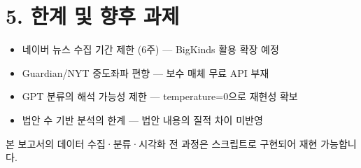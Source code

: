 \documentclass[11pt, a4paper]{article}
\begin{document}
\section*{\color{headerblue}5. 한계 및 향후 과제}
\begin{itemize}[noitemsep]
    \item 네이버 뉴스 수집 기간 제한 (6주) — BigKinds 활용 확장 예정
    \item Guardian/NYT 중도좌파 편향 — 보수 매체 무료 API 부재
    \item GPT 분류의 해석 가능성 제한 — temperature=0으로 재현성 확보
    \item 법안 수 기반 분석의 한계 — 법안 내용의 질적 차이 미반영
\end{itemize}

\vfill
\begin{center}
\small\color{gray}
본 보고서의 데이터 수집·분류·시각화 전 과정은 스크립트로 구현되어 재현 가능합니다.
\end{center}
\end{document}
